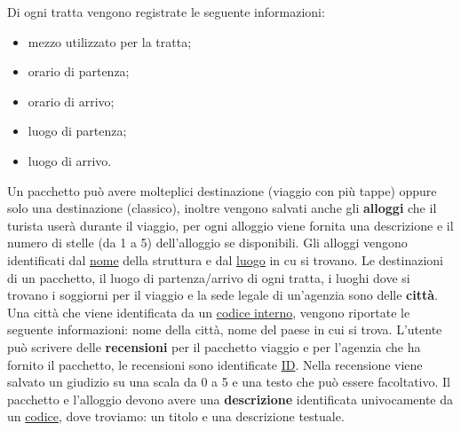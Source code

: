 \noindent
Di ogni tratta vengono registrate le seguente informazioni:
\begin{multicols}{2}
    \begin{itemize}
        \item mezzo utilizzato per la tratta;
        \item orario di partenza;
        \item orario di arrivo;
        \item luogo di partenza;
        \item luogo di arrivo.
    \end{itemize}
\end{multicols}
\noindent
%
%
Un pacchetto può avere molteplici destinazione (viaggio con più tappe) oppure solo una destinazione (classico), inoltre vengono salvati anche gli \textbf{alloggi} che il turista userà durante il viaggio, per ogni alloggio viene fornita una descrizione e il numero di stelle (da 1 a 5) dell'alloggio se disponibili. Gli alloggi vengono identificati dal \underline{nome} della struttura e dal \underline{luogo} in cu si trovano.
%
%
Le destinazioni di un pacchetto, il luogo di partenza/arrivo di ogni tratta, i luoghi dove si trovano i soggiorni per il viaggio e la sede legale di un'agenzia sono delle \textbf{città}. Una città che viene identificata da un \underline{codice interno}, vengono riportate le seguente informazioni: nome della città, nome del paese in cui si trova.
%
%
L'utente può scrivere delle \textbf{recensioni} per il pacchetto viaggio e per l'agenzia che ha fornito il pacchetto, le recensioni sono identificate \underline{ID}. Nella recensione viene salvato un giudizio su una scala da 0 a 5 e una testo che può essere facoltativo.
%
%
Il pacchetto e l'alloggio devono avere una \textbf{descrizione} identificata univocamente da un \underline{codice}, dove troviamo: un titolo e una descrizione testuale.
%

